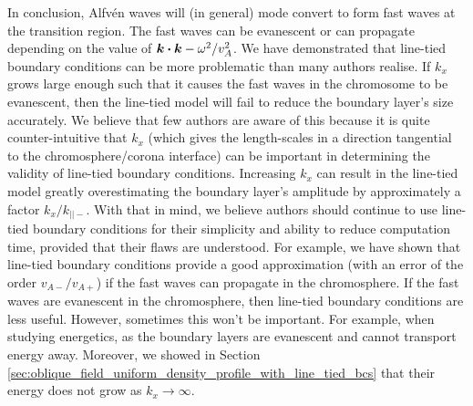 In conclusion, Alfv\'en waves will (in general) mode convert to form fast waves at the transition region. The fast waves can be evanescent or can propagate depending on the value of $\vec{k}\vdot\vec{k} - \omega^2/v_A^2$. We have demonstrated that line-tied boundary conditions can be more problematic than many authors realise. If $k_x$ grows large enough such that it causes the fast waves in the chromosome to be evanescent, then the line-tied model will fail to reduce the boundary layer's size accurately. We believe that few authors are aware of this because it is quite counter-intuitive that $k_x$ (which gives the length-scales in a direction tangential to the chromosphere/corona interface) can be important in determining the validity of line-tied boundary conditions. Increasing $k_x$ can result in the line-tied model greatly overestimating the boundary layer's amplitude by approximately a factor $k_x / k_{||-}$. With that in mind, we believe authors should continue to use line-tied boundary conditions for their simplicity and ability to reduce computation time, provided that their flaws are understood. For example, we have shown that line-tied boundary conditions provide a good approximation (with an error of the order $v_{A-}/v_{A+}$) if the fast waves can propagate in the chromosphere. If the fast waves are evanescent in the chromosphere, then line-tied boundary conditions are less useful. However, sometimes this won't be important. For example, when studying energetics, as the boundary layers are evanescent and cannot transport energy away. Moreover, we showed in Section \ref{sec:oblique_field_uniform_density_profile_with_line_tied_bcs} that their energy does not grow as $k_x\rightarrow \infty$.

